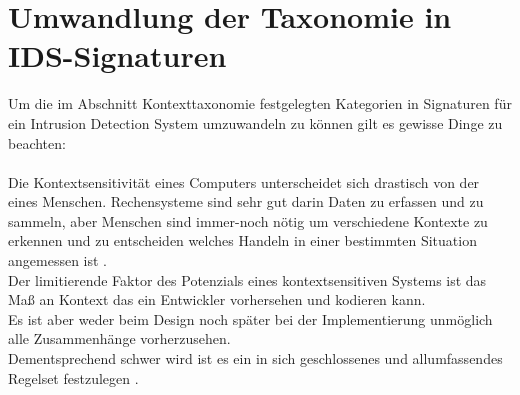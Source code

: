 	

\section{Umwandlung der Taxonomie in IDS-Signaturen} 

Um die im Abschnitt Kontexttaxonomie festgelegten Kategorien in Signaturen für ein Intrusion Detection System umzuwandeln zu können gilt es gewisse Dinge zu beachten:\\\\ Die Kontextsensitivität eines Computers unterscheidet sich drastisch von der eines Menschen. Rechensysteme sind sehr gut darin Daten zu erfassen und zu sammeln, aber Menschen sind immer-noch nötig um verschiedene Kontexte zu erkennen und zu entscheiden welches Handeln in einer bestimmten Situation angemessen ist \cite{dey_understanding_2001}.\\
Der limitierende Faktor des Potenzials eines kontextsensitiven Systems ist das Maß an Kontext das ein Entwickler vorhersehen und kodieren kann.\\
Es ist aber weder beim Design noch später bei der Implementierung unmöglich alle Zusammenhänge vorherzusehen.\\
Dementsprechend schwer wird ist es ein in sich geschlossenes und allumfassendes Regelset festzulegen \cite{perera_context_2014}.\\\\
